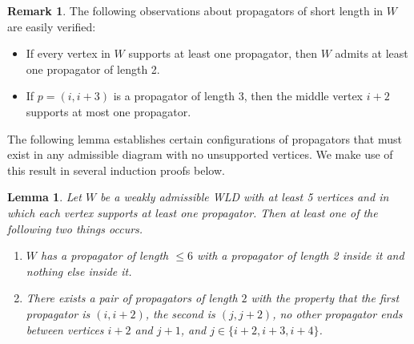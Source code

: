 \documentclass[11pt]{article}
\newtheorem{lem}[thm]{Lemma}
\theoremstyle{remark}
\theoremstyle{definition}
\newtheorem{rmk}[thm]{Remark}
\begin{document}
\begin{rmk}\label{rem:props of length 2 and 3}
The following observations about propagators of short length in $W$ are easily verified:
\begin{itemize}
\item If every vertex in $W$ supports at least one propagator, then $W$ admits at least one propagator of length 2.
\item If $p = (i,i+3)$ is a propagator of length 3, then the middle vertex $i+2$ supports at most one propagator.
\end{itemize}
\end{rmk}


The following lemma establishes certain configurations of propagators that must exist in any admissible diagram with no unsupported vertices. We make use of this result in several induction proofs below.

\begin{lem}\label{lem sian}
  Let $W$ be a weakly admissible WLD with at least 5 vertices and in which each vertex supports at least one propagator.  Then at least one of the following two things occurs.
  \begin{enumerate}
    \item $W$ has a propagator of length $\leq 6$ with a propagator of length 2 inside it and nothing else inside it.\label{item big and 2}
    \item There exists a pair of propagators of length $2$ with the property that the first propagator is $(i, i+2)$, the second is $(j, j+2)$, no other propagator ends between vertices $i+2$ and $j+1$, and $j\in\{i+2, i+3, i+4\}$.\label{item pair of 2s}
  \end{enumerate}
\end{lem}
\end{document}
